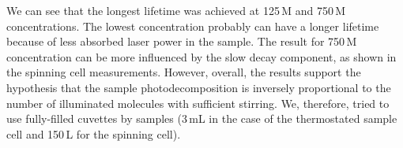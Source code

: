 We can see that the longest lifetime was achieved at 125\,M and
750\,M concentrations.
The lowest concentration probably can have a longer lifetime because of less
absorbed laser power in the sample.
The result for 750\,M concentration can be more influenced by the slow
decay component, as shown in the spinning cell measurements.
However, overall, the results support the hypothesis that the sample
photodecomposition is inversely proportional to the number of illuminated
molecules with sufficient stirring.
We, therefore, tried to use fully-filled cuvettes by samples (3\,mL in the case
of the thermostated sample cell and 150\,L for the spinning cell).
